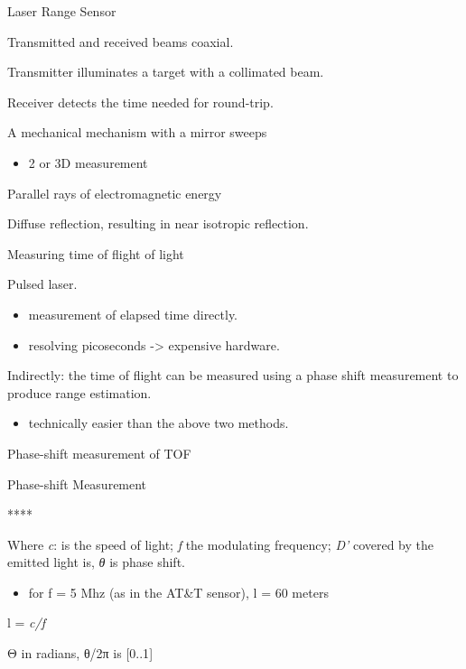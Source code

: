 \documentclass[compress]{beamer}
\begin{document}
\begin{frame}{Laser Range Sensor}

Transmitted and received beams coaxial.

Transmitter illuminates a target with a collimated beam.

Receiver detects the time needed for round-trip.

A mechanical mechanism with a mirror sweeps

\begin{itemize}

\item
  2 or 3D measurement
\end{itemize}

Parallel rays of electromagnetic energy

Diffuse reflection, resulting in near isotropic reflection.

\end{frame}

\begin{frame}{Measuring time of flight of light}

Pulsed laser.

\begin{itemize}

\item
  measurement of elapsed time directly.
\item
  resolving picoseconds -\textgreater{} expensive hardware.
\end{itemize}

Indirectly: the time of flight can be measured using a phase shift
measurement to produce range estimation.

\begin{itemize}

\item
  technically easier than the above two methods.
\end{itemize}

\end{frame}

\begin{frame}{Phase-shift measurement of TOF}

Phase-shift Measurement

\end{frame}

\begin{frame}{****}

\end{frame}

\begin{frame}{Where \emph{c}: is the speed of light; \emph{f} the
modulating frequency; \emph{D'} covered by the emitted light is,
\emph{θ} is phase shift.}

\begin{itemize}

\item
  for f = 5 Mhz (as in the AT\&T sensor), l = 60 meters
\end{itemize}

l = \emph{c/f}

Θ in radians, θ/2π is {[}0..1{]}

\end{frame}
\end{document}
